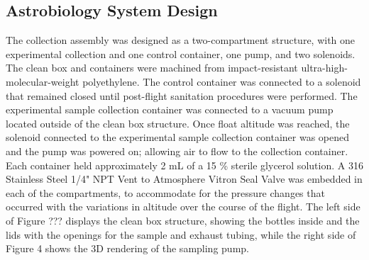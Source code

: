 \subsection{Astrobiology System Design}
\label{sec:Astrobiology Design}
The collection assembly was designed as a two-compartment structure, with one experimental collection and one control container, one pump, and two solenoids. The clean box and containers were machined from impact-resistant ultra-high-molecular-weight polyethylene.  
The control container was connected to a solenoid that remained closed until post-flight sanitation procedures were performed. The experimental sample collection container was connected to a vacuum pump located outside of the clean box structure. Once float altitude was reached, the solenoid connected to the experimental sample collection container was opened and the pump was powered on; allowing air to flow to the collection container. Each container held approximately 2 mL of a 15 \% sterile glycerol solution. A 316 Stainless Steel 1/4" NPT Vent to Atmosphere Vitron Seal Valve was embedded in each of the compartments, to accommodate for the pressure changes that occurred with the variations in altitude over the course of the flight. The left side of Figure ??? displays the clean box structure, showing the bottles inside and the lids with the openings for the sample and exhaust tubing, while the right side of Figure 4 shows the 3D rendering of the sampling pump.